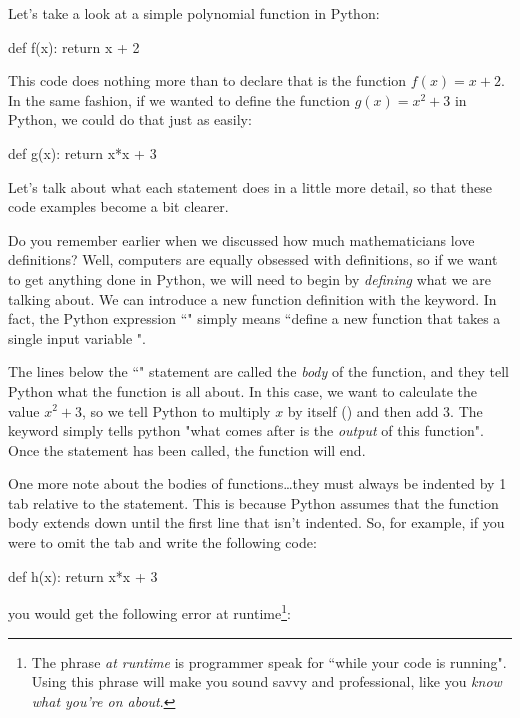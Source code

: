 Let's take a look at a simple polynomial function in Python:

\begin{python}
def f(x):
	return x + 2
\end{python}

This code does nothing more than to declare that  is the function $f(x) = x + 2$. In the same fashion, if we wanted to define the function $g(x) = x^2 + 3$ in Python, we could do that just as easily:

\begin{python}
def g(x):
	return x*x + 3
\end{python}

Let's talk about what each statement does in a little more detail, so that these code examples become a bit clearer. 

Do you remember earlier when we discussed how much mathematicians love definitions? Well, computers are equally obsessed with definitions, so if we want to get anything done in Python, we will need to begin by \emph{defining} what we are talking about. We can introduce a new function definition with the  keyword. In fact, the Python expression ``" simply means ``define a new function  that takes a single input variable ".

The lines below the ``" statement are called the \emph{body} of the function, and they tell Python what the function is all about. In this case, we want to calculate the value $x^2 + 3$, so we tell Python to multiply $x$ by itself () and then add 3. The  keyword simply tells python "what comes after is the \emph{output} of this function". Once the  statement has been called, the function will end.

One more note about the bodies of functions\ldots they must always be indented by 1 tab relative to the  statement. This is because Python assumes that the function body extends down until the first line that isn't indented. So, for example, if you were to omit the tab and write the following code:

\begin{python}
def h(x):
return x*x + 3
\end{python}
you would get the following error at runtime\footnote{The phrase \emph{at runtime} is programmer speak for ``while your code is running". Using this phrase will make you sound savvy and professional, like you \emph{know what you're on about}.}:


